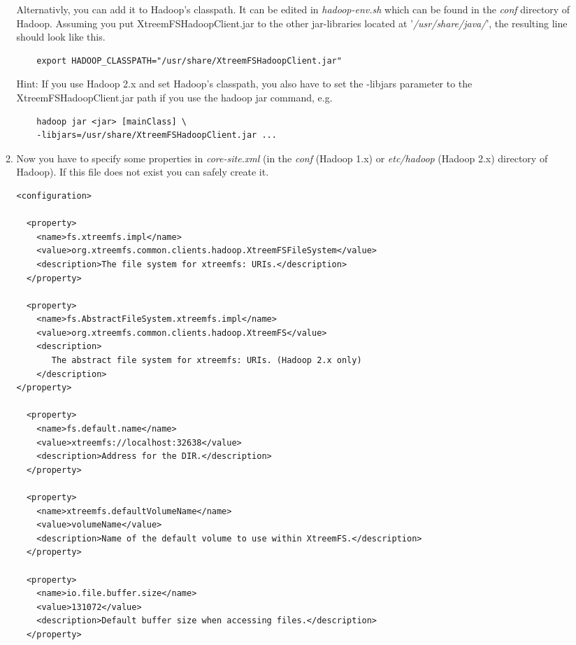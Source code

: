 \documentclass[a4paper,10pt]{book}
\begin{document}
\begin{enumerate}
\begin{enumerate}
	Alternativly, you can add it to Hadoop's classpath. It can be edited in \textit{hadoop-env.sh} which can be found in the \textit{conf} directory of Hadoop. Assuming you put XtreemFSHadoopClient.jar to the other jar-libraries located at '\textit{/usr/share/java/}', the resulting line should look like this.
	\begin{verbatim}
	export HADOOP_CLASSPATH="/usr/share/XtreemFSHadoopClient.jar"
	\end{verbatim}
Hint: If you use Hadoop 2.x and set Hadoop's classpath, you also have to set the -libjars parameter to the XtreemFSHadoopClient.jar path if you use the hadoop jar command, e.g.
    \begin{verbatim}
	hadoop jar <jar> [mainClass] \
	-libjars=/usr/share/XtreemFSHadoopClient.jar ...
    \end{verbatim} 
	\item Now you have to specify some properties in \textit{core-site.xml} (in the \textit{conf} (Hadoop 1.x) or \textit{etc/hadoop} (Hadoop 2.x)
	directory of Hadoop). If this file does not exist you can safely create it.
	\begin{verbatim}
<configuration>

  <property>
    <name>fs.xtreemfs.impl</name>
    <value>org.xtreemfs.common.clients.hadoop.XtreemFSFileSystem</value>
    <description>The file system for xtreemfs: URIs.</description>
  </property>

  <property>
    <name>fs.AbstractFileSystem.xtreemfs.impl</name>
    <value>org.xtreemfs.common.clients.hadoop.XtreemFS</value>
    <description>
       The abstract file system for xtreemfs: URIs. (Hadoop 2.x only)
    </description>
</property>

  <property>
    <name>fs.default.name</name>
    <value>xtreemfs://localhost:32638</value>
    <description>Address for the DIR.</description>
  </property>

  <property>
    <name>xtreemfs.defaultVolumeName</name>
    <value>volumeName</value>
    <description>Name of the default volume to use within XtreemFS.</description>
  </property>
  
  <property>
    <name>io.file.buffer.size</name>
    <value>131072</value>
    <description>Default buffer size when accessing files.</description>
  </property>


\end{verbatim}
\end{enumerate}
\end{enumerate}
\end{document}
